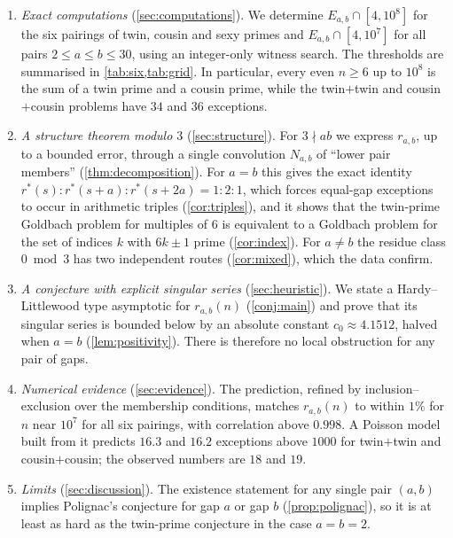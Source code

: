 \documentclass[11pt]{amsart}
\theoremstyle{definition}
\theoremstyle{remark}
\begin{document}
\begin{enumerate}
\item \emph{Exact computations} (\cref{sec:computations}). We determine $E_{a,b}\cap[4,10^8]$ for the six pairings of twin, cousin and sexy primes and $E_{a,b}\cap[4,10^7]$ for all pairs $2\le a\le b\le 30$, using an integer-only witness search. The thresholds are summarised in \cref{tab:six,tab:grid}. In particular, every even $n\ge 6$ up to $10^8$ is the sum of a twin prime and a cousin prime, while the twin$+$twin and cousin$+$cousin problems have $34$ and $36$ exceptions.

\item \emph{A structure theorem modulo $3$} (\cref{sec:structure}). For $3\nmid ab$ we express $r_{a,b}$, up to a bounded error, through a single convolution $N_{a,b}$ of ``lower pair members'' (\cref{thm:decomposition}). For $a=b$ this gives the exact identity $r^*(s):r^*(s+a):r^*(s+2a)=1:2:1$, which forces equal-gap exceptions to occur in arithmetic triples (\cref{cor:triples}), and it shows that the twin-prime Goldbach problem for multiples of $6$ is equivalent to a Goldbach problem for the set of indices $k$ with $6k\pm1$ prime (\cref{cor:index}). For $a\neq b$ the residue class $0\bmod 3$ has two independent routes (\cref{cor:mixed}), which the data confirm.

\item \emph{A conjecture with explicit singular series} (\cref{sec:heuristic}). We state a Hardy--Littlewood type asymptotic for $r_{a,b}(n)$ (\cref{conj:main}) and prove that its singular series is bounded below by an absolute constant $c_0\approx 4.1512$, halved when $a=b$ (\cref{lem:positivity}). There is therefore no local obstruction for any pair of gaps.

\item \emph{Numerical evidence} (\cref{sec:evidence}). The prediction, refined by inclusion--exclusion over the membership conditions, matches $r_{a,b}(n)$ to within $1\%$ for $n$ near $10^7$ for all six pairings, with correlation above $0.998$. A Poisson model built from it predicts $16.3$ and $16.2$ exceptions above $1000$ for twin$+$twin and cousin$+$cousin; the observed numbers are $18$ and $19$.

\item \emph{Limits} (\cref{sec:discussion}). The existence statement for any single pair $(a,b)$ implies Polignac's conjecture for gap $a$ or gap $b$ (\cref{prop:polignac}), so it is at least as hard as the twin-prime conjecture in the case $a=b=2$.
\end{enumerate}
\end{document}
